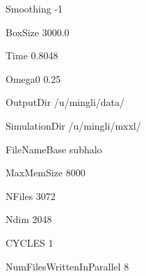 Smoothing -1

BoxSize 3000.0

Time    0.8048

Omega0  0.25

OutputDir /u/mingli/data/

SimulationDir /u/mingli/mxxl/

FileNameBase subhalo

MaxMemSize 8000

NFiles 3072

Ndim   2048

CYCLES 1

NumFilesWrittenInParallel 8

